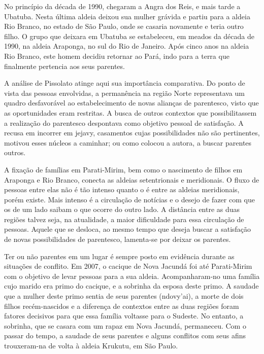 \documentclass{article}
\begin{document}
No princ\'ipio da d\'ecada de 1990, chegaram a Angra dos Reis, e mais
tarde a Ubatuba. Nesta \'ultima aldeia deixou sua mulher gr\'avida e
partiu para a aldeia Rio Branco, no estado de S\~ao Paulo, onde se
casaria novamente e teria outro filho. O grupo que deixara em Ubatuba
se estabeleceu, em meados da d\'ecada de 1990, na aldeia Araponga, no
sul do Rio de Janeiro. Ap\'os cinco anos na aldeia Rio Branco, este
homem decidiu retornar ao Par\'a, indo para a terra que finalmente
pertencia aos seus parentes.

A an\'alise de Pissolato atinge aqui sua import\^ancia comparativa. Do
ponto de vista das pessoas envolvidas, a perman\^encia na regi\~ao
Norte representava um quadro desfavor\'avel ao estabelecimento de novas
alian\c{c}as de parentesco, visto que as oportunidades eram restritas.
A busca de outros contextos que possibilitassem a realiza\c{c}\~ao do
parentesco despontava como objetivo pessoal de satisfa\c{c}\~ao. A
recusa em incorrer em jejavy, casamentos cujas possibilidades n\~ao
s\~ao pertinentes, motivou esses n\'ucleos a caminhar; ou como colocou
a autora, a buscar parentes outros. 

A fixa\c{c}\~ao de fam\'ilias em Parati-Mirim, bem como o nascimento de
filhos em Araponga e Rio Branco, conecta as aldeias setentrionais e
meridionais. O fluxo de pessoas entre elas n\~ao \'e t\~ao intenso
quanto o \'e entre as aldeias meridionais, por\'em existe. Mais intenso
\'e a circula\c{c}\~ao de not\'icias e o desejo de fazer com que os de
um lado saibam o que ocorre do outro lado. A dist\^ancia entre as duas
regi\~oes talvez seja, na atualidade, a maior dificuldade para essa
circula\c{c}\~ao de pessoas. Aquele que se desloca, ao mesmo tempo que
deseja buscar a satisfa\c{c}\~ao de novas possibilidades de parentesco,
lamenta-se por deixar os parentes. 

Ter ou n\~ao parentes em um lugar \'e sempre posto em evid\^encia
durante as situa\c{c}\~oes de conflito. Em 2007, o cacique de Nova
Jacund\'a foi at\'e Parati-Mirim com o objetivo de levar pessoas para a
sua aldeia. Acompanharam-no uma fam\'ilia cujo marido era primo do
cacique, e a sobrinha da esposa deste primo. A saudade que a mulher
deste primo sentia de seus parentes (ndovy{\textquoteright}ai), a morte
de dois filhos rec\'em-nascidos e a diferen\c{c}a de contextos entre as
duas regi\~oes foram fatores decisivos para que essa fam\'ilia voltasse
para o Sudeste. No entanto, a sobrinha, que se casara com um rapaz em
Nova Jacund\'a, permaneceu. Com o passar do tempo, a saudade de seus
parentes e alguns conflitos com seus afins trouxeram-na de volta \`a
aldeia Krukutu, em S\~ao Paulo.
\end{document}
